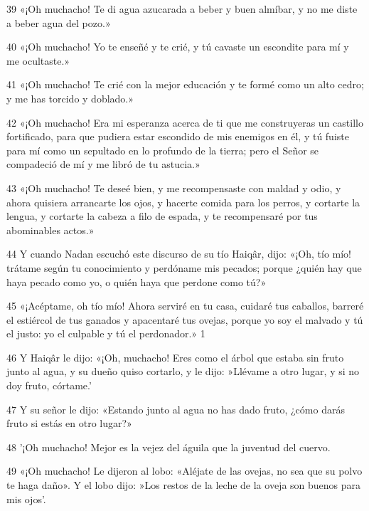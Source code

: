 \par 39 «¡Oh muchacho! Te di agua azucarada a beber y buen almíbar, y no me diste a beber agua del pozo.»

\par 40 «¡Oh muchacho! Yo te enseñé y te crié, y tú cavaste un escondite para mí y me ocultaste.»

\par 41 «¡Oh muchacho! Te crié con la mejor educación y te formé como un alto cedro; y me has torcido y doblado.»

\par 42 «¡Oh muchacho! Era mi esperanza acerca de ti que me construyeras un castillo fortificado, para que pudiera estar escondido de mis enemigos en él, y tú fuiste para mí como un sepultado en lo profundo de la tierra; pero el Señor se compadeció de mí y me libró de tu astucia.»

\par 43 «¡Oh muchacho! Te deseé bien, y me recompensaste con maldad y odio, y ahora quisiera arrancarte los ojos, y hacerte comida para los perros, y cortarte la lengua, y cortarte la cabeza a filo de espada, y te recompensaré por tus abominables actos.»

\par 44 Y cuando Nadan escuchó este discurso de su tío Haiqâr, dijo: «¡Oh, tío mío! trátame según tu conocimiento y perdóname mis pecados; porque ¿quién hay que haya pecado como yo, o quién haya que perdone como tú?»

\par 45 «¡Acéptame, oh tío mío! Ahora serviré en tu casa, cuidaré tus caballos, barreré el estiércol de tus ganados y apacentaré tus ovejas, porque yo soy el malvado y tú el justo: yo el culpable y tú el perdonador.» 1

\par 46 Y Haiqâr le dijo: «¡Oh, muchacho! Eres como el árbol que estaba sin fruto junto al agua, y su dueño quiso cortarlo, y le dijo: »Llévame a otro lugar, y si no doy fruto, córtame.'

\par 47 Y su señor le dijo: «Estando junto al agua no has dado fruto, ¿cómo darás fruto si estás en otro lugar?»

\par 48 '¡Oh muchacho! Mejor es la vejez del águila que la juventud del cuervo.

\par 49 «¡Oh muchacho! Le dijeron al lobo: «Aléjate de las ovejas, no sea que su polvo te haga daño». Y el lobo dijo: »Los restos de la leche de la oveja son buenos para mis ojos'.

